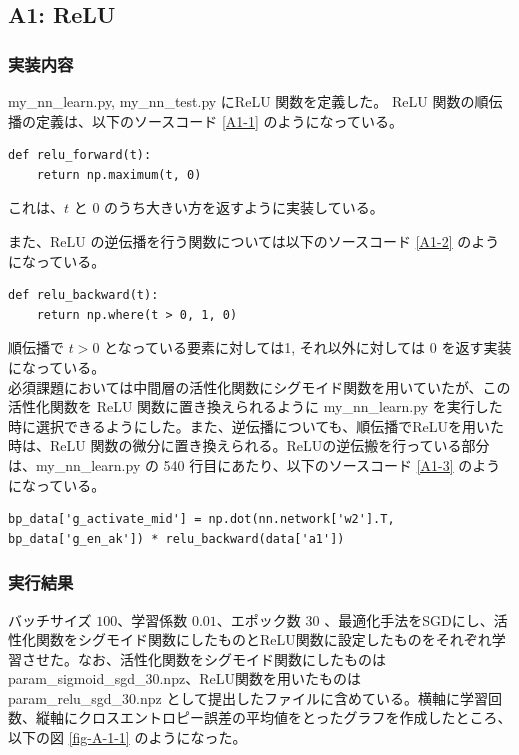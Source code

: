\documentclass[a4paper,dvipdfmx]{jsarticle}
\begin{document}
\subsection*{A1: ReLU}

\subsubsection*{実装内容}

my\_nn\_learn.py, my\_nn\_test.py にReLU 関数を定義した。
ReLU 関数の順伝播の定義は、以下のソースコード \ref{A1-1} のようになっている。

\begin{lstlisting}[caption="ReLU 関数(順伝播)",label=A1-1]
def relu_forward(t):
    return np.maximum(t, 0)
\end{lstlisting}

これは、$t$ と $0$ のうち大きい方を返すように実装している。

また、ReLU の逆伝播を行う関数については以下のソースコード \ref{A1-2} のようになっている。

\begin{lstlisting}[caption="ReLU 関数(逆伝播)",label=A1-2]
def relu_backward(t):
    return np.where(t > 0, 1, 0)
\end{lstlisting}

順伝播で $t > 0$ となっている要素に対しては1, それ以外に対しては 0 を返す実装になっている。\\

必須課題においては中間層の活性化関数にシグモイド関数を用いていたが、この活性化関数を ReLU 関数に置き換えられるように my\_nn\_learn.py を実行した時に選択できるようにした。また、逆伝播についても、順伝播でReLUを用いた時は、ReLU 関数の微分に置き換えられる。ReLUの逆伝搬を行っている部分は、my\_nn\_learn.py の 540 行目にあたり、以下のソースコード \ref{A1-3} のようになっている。

\begin{lstlisting}[caption="ReLU の逆伝播 を行う部分",label=A1-3]
bp_data['g_activate_mid'] = np.dot(nn.network['w2'].T, bp_data['g_en_ak']) * relu_backward(data['a1'])
\end{lstlisting}

\subsubsection*{実行結果}

バッチサイズ $100$、学習係数 $0.01$、エポック数 $30$ 、最適化手法をSGDにし、活性化関数をシグモイド関数にしたものとReLU関数に設定したものをそれぞれ学習させた。なお、活性化関数をシグモイド関数にしたものは param\_sigmoid\_sgd\_30.npz、ReLU関数を用いたものは param\_relu\_sgd\_30.npz として提出したファイルに含めている。横軸に学習回数、縦軸にクロスエントロピー誤差の平均値をとったグラフを作成したところ、以下の図 \ref{fig-A-1-1} のようになった。
\end{document}

